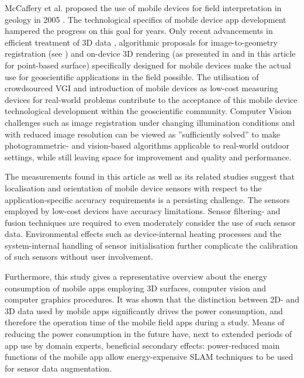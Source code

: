 \documentclass[review]{elsarticle}
\begin{document}
McCaffery et al. proposed the use of mobile devices for field interpretation in geology in 2005 \cite{McCaffrey2005}. The technological specifics of mobile device app development hampered the progress on this goal for years. Only recent advancements in efficient treatment of 3D data \cite{Kroehnert2017}, algorithmic proposals for image-to-geometry registration (see \citep{Gauglitz2014,Kehl2017_VGC}) and on-device 3D rendering (as presented in \cite{Agus2017} and in this article for point-based surface) specifically designed for mobile devices make the actual use for geoscientific applications in the field possible. The utilisation of crowdsourced \gls{VGI} and introduction of mobile devices as low-cost measuring devices for real-world problems \cite{Eltner2017} contribute to the acceptance of this mobile device technological development within the geoscientific community. Computer Vision challenges such as image registration under changing illumination conditions and with reduced image resolution can be viewed as ''sufficiently solved'' to make photogrammetric- and vision-based algorithms applicable to real-world outdoor settings, while still leaving space for improvement and quality and performance.

The measurements found in this article as well as its related studies suggest that localisation and orientation of mobile device sensors with respect to the application-specific accuracy requirements is a persisting challenge. The sensors employed by low-cost devices have accuracy limitations. Sensor filtering- and fusion techniques are required to even moderately consider the use of such sensor data. Environmental effects such as device-internal heating processes and the system-internal handling of sensor initialisation further complicate the calibration of such sensors without user involvement.

Furthermore, this study gives a representative overview about the energy consumption of mobile apps employing 3D surfaces, computer vision and computer graphics procedures. It was shown that the distinction between 2D- and 3D data used by mobile apps significantly drives the power consumption, and therefore the operation time of the mobile field apps during a study. Means of reducing the power consumption in the future have, next to extended periods of app use by domain experts, beneficial secondary effects: power-reduced main functions of the mobile app allow energy-expensive \gls{SLAM} techniques to be used for sensor data augmentation. %
\end{document}
